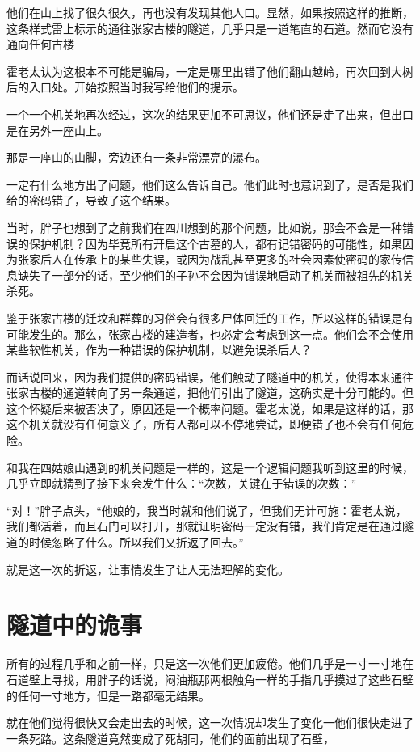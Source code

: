 他们在山上找了很久很久，再也没有发现其他人口。显然，如果按照这样的推断，这条样式雷上标示的通往张家古楼的隧道，几乎只是一道笔直的石道。然而它没有通向任何古楼

霍老太认为这根本不可能是骗局，一定是哪里出错了他们翻山越岭，再次回到大树后的入口处。开始按照当时我写给他们的提示。

一个一个机关地再次经过，这次的结果更加不可思议，他们还是走了出来，但出口是在另外一座山上。

那是一座山的山脚，旁边还有一条非常漂亮的瀑布。

一定有什么地方出了问题，他们这么告诉自己。他们此时也意识到了，是否是我们给的密码错了，导致了这个结果。

当时，胖子也想到了之前我们在四川想到的那个问题，比如说，那会不会是一种错误的保护机制？因为毕竞所有开启这个古墓的人，都有记错密码的可能性，如果因为张家后人在传承上的某些失误，或因为战乱甚至更多的社会因素使密码的家传信息缺失了一部分的话，至少他们的子孙不会因为错误地启动了机关而被祖先的机关杀死。

鉴于张家古楼的迁坟和群葬的习俗会有很多尸体回迁的工作，所以这样的错误是有可能发生的。那么，张家古楼的建造者，也必定会考虑到这一点。他们会不会使用某些软性机关，作为一种错误的保护机制，以避免误杀后人？

而话说回来，因为我们提供的密码错误，他们触动了隧道中的机关，使得本来通往张家古楼的通道转向了另一条通道，把他们引出了隧道，这确实是十分可能的。但这个怀疑后来被否决了，原因还是一个概率问题。霍老太说，如果是这样的话，那这个机关就没有任何意义了，所有人都可以不停地尝试，即便错了也不会有任何危险。

和我在四姑娘山遇到的机关问题是一样的，这是一个逻辑问题我听到这里的时候，几乎立即就猜到了接下来会发生什么：“次数，关键在于错误的次数：”

“对！”胖子点头，“他娘的，我当时就和他们说了，但我们无计可施：霍老太说，我们都活着，而且石门可以打开，那就证明密码一定没有错，我们肯定是在通过隧道的时候忽略了什么。所以我们又折返了回去。”

就是这一次的折返，让事情发生了让人无法理解的变化。

\chapter{隧道中的诡事}

所有的过程几乎和之前一样，只是这一次他们更加疲倦。他们几乎是一寸一寸地在石道壁上寻找，用胖子的话说，闷油瓶那两根触角一样的手指几乎摸过了这些石壁的任何一寸地方，但是一路都毫无结果。

就在他们觉得很快又会走出去的时候，这一次情况却发生了变化一他们很快走进了一条死路。这条隧道竟然变成了死胡同，他们的面前出现了石壁，

